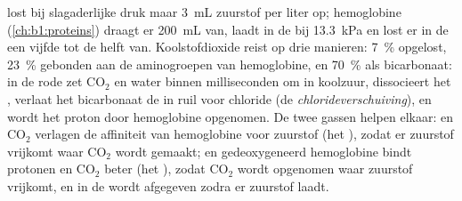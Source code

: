 \begin{proposition}\label{prop:b1:gas-exchange:transport}
 lost bij slagaderlijke druk maar \qty{3}{mL} zuurstof per liter op;
hemoglobine (\cref{ch:b1:proteins}) draagt er \qty{200}{mL} van, laadt in de 
bij \qty{13.3}{kPa} en lost er in de  een vijfde tot de helft van.
Koolstofdioxide reist op drie manieren: \qty{7}{\%} opgelost, \qty{23}{\%} gebonden
aan de aminogroepen van hemoglobine, en \qty{70}{\%} als bicarbonaat: in de rode 
zet \emph{} $\mathrm{CO_2}$ en water binnen milliseconden om in
koolzuur, dissocieert het , verlaat het bicarbonaat de  in ruil voor chloride
(de \emph{chlorideverschuiving}), en wordt het proton door hemoglobine opgenomen. De
twee gassen helpen elkaar:  en $\mathrm{CO_2}$ verlagen de affiniteit van
hemoglobine voor zuurstof (het \emph{}), zodat er zuurstof vrijkomt waar
$\mathrm{CO_2}$ wordt gemaakt; en gedeoxygeneerd hemoglobine bindt protonen en
$\mathrm{CO_2}$ beter (het \emph{}), zodat $\mathrm{CO_2}$ wordt
opgenomen waar zuurstof vrijkomt, en in de  wordt afgegeven zodra er zuurstof
laadt.
\end{proposition}

